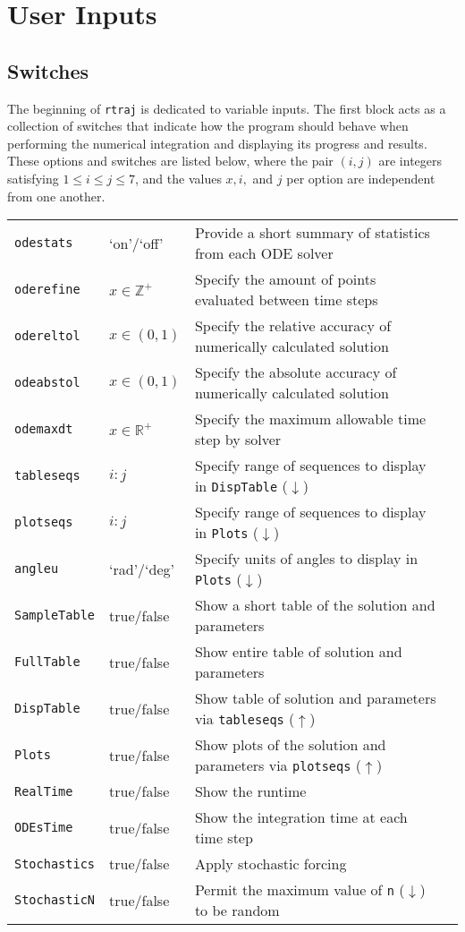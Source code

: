 \documentclass[11pt]{thesis}
\numberwithin{equation}{section}
\begin{document}
\section{User Inputs}
\subsection{Switches}
The beginning of \texttt{rtraj} is dedicated to variable inputs. The first block acts as a collection of switches that indicate how the program should behave when performing the numerical integration and displaying its progress and results.
These options and switches are listed below, where the pair $(i,j)$ are integers satisfying $1 \leq i \leq j \leq 7$, and the values $x, i,$ and $j$ per option are independent from one another.

\begin{longtable}[l]{l l l l}
\texttt{odestats} & `on'/`off' & Provide a short summary of statistics from each ODE solver \\
\texttt{oderefine} & $x \in \mathbb{Z}^+$ & Specify the amount of points evaluated between time steps \\
\texttt{odereltol} & $x \in (0, 1)$ & Specify the relative accuracy of numerically calculated solution \\
\texttt{odeabstol} & $x \in (0, 1)$ & Specify the absolute accuracy of numerically calculated solution \\
\texttt{odemaxdt} & $x \in \mathbb{R}^+$ & Specify the maximum allowable time step by solver \\
\texttt{tableseqs} & $i\!:\!j$ & Specify range of sequences to display in \texttt{DispTable} ($\downarrow$) \\
\texttt{plotseqs} & $i\!:\!j$ & Specify range of sequences to display in \texttt{Plots} ($\downarrow$)\\
\texttt{angleu} & `rad'/`deg' & Specify units of angles to display in \texttt{Plots} ($\downarrow$)\\
\texttt{SampleTable} & true/false & Show a short table of the solution and parameters \\
\texttt{FullTable} & true/false & Show entire table of solution and parameters \\
\texttt{DispTable} & true/false & Show table of solution and parameters via \texttt{tableseqs} ($\uparrow$)\\
\texttt{Plots} & true/false & Show plots of the solution and parameters via \texttt{plotseqs} ($\uparrow$)\\
\texttt{RealTime} & true/false & Show the runtime \\
\texttt{ODEsTime} & true/false & Show the integration time at each time step \\
\texttt{Stochastics} & true/false & Apply stochastic forcing \\
\texttt{StochasticN} & true/false & Permit the maximum value of \texttt{n} ($\downarrow$) to be random
\end{longtable}
\end{document}
